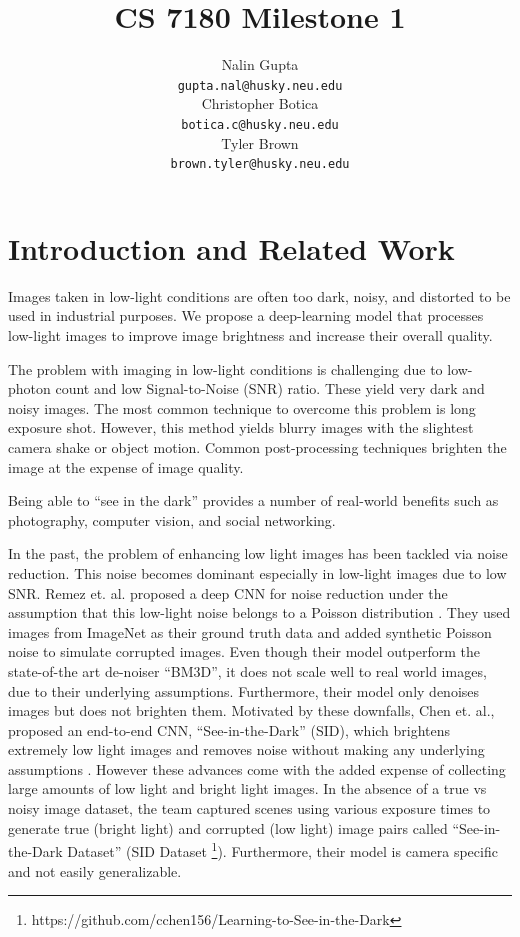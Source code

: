 \documentclass{article}
\title{CS 7180 Milestone 1}
\author{%
  Nalin Gupta \\
  \texttt{gupta.nal@husky.neu.edu} \\
  \And
  Christopher Botica\\
  \texttt{botica.c@husky.neu.edu} \\
  \And
  Tyler Brown\\
  \texttt{brown.tyler@husky.neu.edu} \\
}
\begin{document}

\maketitle

\section{Introduction and Related Work}

Images taken in low-light conditions are often too dark, noisy, and distorted to be used in industrial purposes. We propose a deep-learning model that processes low-light
images to improve image brightness and increase their overall quality.

The problem with imaging in low-light conditions is challenging due to low-photon count
and low Signal-to-Noise (SNR) ratio. These yield very dark and noisy images.
The most common technique to overcome this problem is long exposure shot.
However, this method yields blurry images with the slightest camera shake
or object motion\cite{chen2018learning}. Common post-processing techniques brighten the image at the expense of image quality. 

Being able to ``see in the dark'' provides a
number of real-world benefits such as photography, computer vision, and
social networking. 

In the past, the problem of enhancing low light images has been tackled via
noise reduction. This noise becomes dominant especially in low-light images
due to low SNR. Remez et. al. proposed a deep CNN for noise reduction under
the assumption that this low-light noise belongs to a Poisson
distribution \cite{remez2017deep}.  They used images from ImageNet
\cite{imagenet_cvpr09} as their ground truth data
and added synthetic Poisson noise to simulate corrupted images. Even though
their model outperform the state-of-the art de-noiser ``BM3D'', it does not
scale well to real world images, due to their underlying assumptions.
Furthermore, their model only denoises images but does not brighten them.
Motivated by these downfalls, Chen et. al., proposed an end-to-end CNN,
``See-in-the-Dark'' (SID), which brightens extremely low light images and
removes noise without making any underlying assumptions
\cite{chen2018learning}. However these advances come with the added expense
of collecting large amounts of low
light and bright light images. In the absence of a true vs noisy image
dataset, the team captured scenes using various exposure times to generate
true (bright light) and corrupted (low light) image pairs called
``See-in-the-Dark Dataset'' (SID Dataset \footnote{https://github.com/cchen156/Learning-to-See-in-the-Dark}). Furthermore, their model is camera
specific and not easily generalizable.
\end{document}
